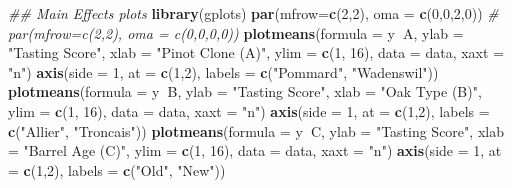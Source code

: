 \documentclass[]{article}
\newenvironment{Shaded}{\begin{snugshade}}{\end{snugshade}}
\newcommand{\CommentTok}[1]{\textcolor[rgb]{0.56,0.35,0.01}{\textit{#1}}}
\newcommand{\DataTypeTok}[1]{\textcolor[rgb]{0.13,0.29,0.53}{#1}}
\newcommand{\DecValTok}[1]{\textcolor[rgb]{0.00,0.00,0.81}{#1}}
\newcommand{\KeywordTok}[1]{\textcolor[rgb]{0.13,0.29,0.53}{\textbf{#1}}}
\newcommand{\NormalTok}[1]{#1}
\newcommand{\OperatorTok}[1]{\textcolor[rgb]{0.81,0.36,0.00}{\textbf{#1}}}
\newcommand{\StringTok}[1]{\textcolor[rgb]{0.31,0.60,0.02}{#1}}
\begin{document}
\begin{Shaded}
\begin{Highlighting}[]
\CommentTok{## Main Effects plots}
\KeywordTok{library}\NormalTok{(gplots)}
\KeywordTok{par}\NormalTok{(}\DataTypeTok{mfrow=}\KeywordTok{c}\NormalTok{(}\DecValTok{2}\NormalTok{,}\DecValTok{2}\NormalTok{), }\DataTypeTok{oma =} \KeywordTok{c}\NormalTok{(}\DecValTok{0}\NormalTok{,}\DecValTok{0}\NormalTok{,}\DecValTok{2}\NormalTok{,}\DecValTok{0}\NormalTok{)) }
\CommentTok{# par(mfrow=c(2,2), oma = c(0,0,0,0)) }
\KeywordTok{plotmeans}\NormalTok{(}\DataTypeTok{formula =}\NormalTok{ y}\OperatorTok{~}\NormalTok{A, }\DataTypeTok{ylab =} \StringTok{"Tasting Score"}\NormalTok{, }\DataTypeTok{xlab =} \StringTok{"Pinot Clone (A)"}\NormalTok{, }\DataTypeTok{ylim =} \KeywordTok{c}\NormalTok{(}\DecValTok{1}\NormalTok{, }\DecValTok{16}\NormalTok{), }\DataTypeTok{data =}\NormalTok{ data, }\DataTypeTok{xaxt =} \StringTok{"n"}\NormalTok{)}
\KeywordTok{axis}\NormalTok{(}\DataTypeTok{side =} \DecValTok{1}\NormalTok{, }\DataTypeTok{at =} \KeywordTok{c}\NormalTok{(}\DecValTok{1}\NormalTok{,}\DecValTok{2}\NormalTok{), }\DataTypeTok{labels =} \KeywordTok{c}\NormalTok{(}\StringTok{"Pommard"}\NormalTok{, }\StringTok{"Wadenswil"}\NormalTok{))}
\KeywordTok{plotmeans}\NormalTok{(}\DataTypeTok{formula =}\NormalTok{ y}\OperatorTok{~}\NormalTok{B, }\DataTypeTok{ylab =} \StringTok{"Tasting Score"}\NormalTok{, }\DataTypeTok{xlab =} \StringTok{"Oak Type (B)"}\NormalTok{, }\DataTypeTok{ylim =} \KeywordTok{c}\NormalTok{(}\DecValTok{1}\NormalTok{, }\DecValTok{16}\NormalTok{), }\DataTypeTok{data =}\NormalTok{ data, }\DataTypeTok{xaxt =} \StringTok{"n"}\NormalTok{)}
\KeywordTok{axis}\NormalTok{(}\DataTypeTok{side =} \DecValTok{1}\NormalTok{, }\DataTypeTok{at =} \KeywordTok{c}\NormalTok{(}\DecValTok{1}\NormalTok{,}\DecValTok{2}\NormalTok{), }\DataTypeTok{labels =} \KeywordTok{c}\NormalTok{(}\StringTok{"Allier"}\NormalTok{, }\StringTok{"Troncais"}\NormalTok{))}
\KeywordTok{plotmeans}\NormalTok{(}\DataTypeTok{formula =}\NormalTok{ y}\OperatorTok{~}\NormalTok{C, }\DataTypeTok{ylab =} \StringTok{"Tasting Score"}\NormalTok{, }\DataTypeTok{xlab =} \StringTok{"Barrel Age (C)"}\NormalTok{, }\DataTypeTok{ylim =} \KeywordTok{c}\NormalTok{(}\DecValTok{1}\NormalTok{, }\DecValTok{16}\NormalTok{), }\DataTypeTok{data =}\NormalTok{ data, }\DataTypeTok{xaxt =} \StringTok{"n"}\NormalTok{)}
\KeywordTok{axis}\NormalTok{(}\DataTypeTok{side =} \DecValTok{1}\NormalTok{, }\DataTypeTok{at =} \KeywordTok{c}\NormalTok{(}\DecValTok{1}\NormalTok{,}\DecValTok{2}\NormalTok{), }\DataTypeTok{labels =} \KeywordTok{c}\NormalTok{(}\StringTok{"Old"}\NormalTok{, }\StringTok{"New"}\NormalTok{))}

\end{Highlighting}
\end{Shaded}
\end{document}

